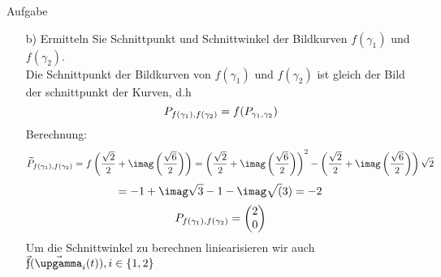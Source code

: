 \documentclass{scrartcl}
\begin{document}
\begin{section}{Aufgabe}
\begin{itemize}
\item[b)]
Ermitteln Sie Schnittpunkt und Schnittwinkel der Bildkurven $f(\gamma_1)$ und $f(\gamma_2)$.\\
Die Schnittpunkt der Bildkurven von $f(\gamma_1)$ und $f(\gamma_2)$ ist gleich der Bild der schnittpunkt der Kurven, d.h
\[\schnt{f(\gamma_1)}{f(\gamma_2)}{P}=f(\schnt{\gamma_1}{\gamma_2}{P})%
\]
Berechnung:
\[\schnt{f(\gamma_1)}{f(\gamma_2)}{\widetilde{P}}=f\left(\frac{\sqrt{2}}{2}+\imag\left(\frac{\sqrt{6}}{2}\right)\right)=\left(\frac{\sqrt{2}}{2}+\imag\left(\frac{\sqrt{6}}{2}\right)\right)^2-\left(\frac{\sqrt{2}}{2}+\imag\left(\frac{\sqrt{6}}{2}\right)\right)\sqrt{2}\]
\[=-1+\imag \sqrt{3}-1 - \imag \sqrt(3)=-2\]
\[\schnt{f(\gamma_1)}{f(\gamma_2)}{P}=\begin{pmatrix}2\\0\end{pmatrix}\]
\newcommand{\f}{\vec{\text{\fontshape{ui}\selectfont f}}}
Um die Schnittwinkel zu berechnen liniearisieren wir auch $\f(\vec{\upgamma}_i(t)), i \in \qty{1,2}$


\end{itemize}
\end{section}
\end{document}
